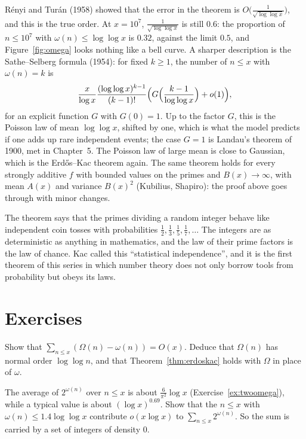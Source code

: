\begin{remark}
Rényi and Turán (1958) showed that the error in the theorem is $O\bigl(\frac1{\sqrt{\log\log x}}\bigr)$, and this is the true order. At $x=10^7$, $\frac1{\sqrt{\log\log x}}$ is still $0.6$: the proportion of $n\le10^7$ with $\omega(n)\le\log\log x$ is $0.32$, against the limit $0.5$, and Figure~\ref{fig:omega} looks nothing like a
bell curve. A sharper description is the Sathe--Selberg formula (1954): for fixed $k\ge1$, the number of $n\le x$ with $\omega(n)=k$ is
\[
\frac x{\log x}\frac{(\log\log x)^{k-1}}{(k-1)!}\Bigl(G\Bigl(\frac{k-1}{\log\log x}\Bigr)+o(1)\Bigr),
\]
for an explicit function $G$ with $G(0)=1$. Up to the factor $G$, this is the Poisson law of mean $\log\log x$, shifted by one, which is what the model predicts if one adds up rare independent
events; the case $G=1$ is Landau's theorem of 1900, met in Chapter~5. The Poisson law of large mean is close to Gaussian, which is the Erd\H{o}s--Kac theorem again. The same theorem holds for every
strongly additive $f$ with bounded values on the primes and $B(x)\to\infty$, with mean $A(x)$ and variance $B(x)^2$ (Kubilius, Shapiro): the proof above goes through with minor changes.
\end{remark}

\begin{beauty}
The theorem says that the primes dividing a random integer behave like independent coin tosses with probabilities $\frac12,\frac13,\frac15,\frac17,\dots$ The integers are as deterministic as anything
in mathematics, and the law of their prime factors is the law of chance. Kac called this ``statistical independence'', and it is the first theorem of this series in which number theory does not
only borrow tools from probability but obeys its laws.
\end{beauty}

\section{Exercises}

\begin{exercise}[$\star$]\label{ex:omegaOmega}
Show that $\sum_{n\le x}(\Omega(n)-\omega(n))=O(x)$. Deduce that $\Omega(n)$ has normal order $\log\log n$, and that Theorem~\ref{thm:erdoskac} holds with $\Omega$ in place of $\omega$.
\end{exercise}

\begin{exercise}[$\star$]\label{ex:taumean}
The average of $2^{\omega(n)}$ over $n\le x$ is about $\frac6{\pi^2}\log x$ (Exercise~\ref{ex:twoomega}), while a typical value is about $(\log x)^{0.69}$. Show that the $n\le x$ with $\omega(n)\le1.4\log\log x$
contribute $o(x\log x)$ to $\sum_{n\le x}2^{\omega(n)}$. So the sum is carried by a set of integers of density $0$.
\end{exercise}

